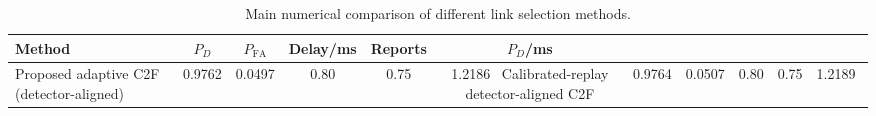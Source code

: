 \begin{table}[t]
    \centering
    \caption{Main numerical comparison of different link selection methods.}
    \label{tab:main_summary}
    \begin{tabular}{l c c c c c}
        \hline
        Method & $P_D$ & $P_{\mathrm{FA}}$ & Delay/ms & Reports & $P_D$/ms \\
        \hline
        Proposed adaptive C2F (detector-aligned) & 0.9762 & 0.0497 & 0.80 & 0.75 & 1.2186 \
        Calibrated-replay detector-aligned C2F & 0.9764 & 0.0507 & 0.80 & 0.75 & 1.2189 \
        \hline
    \end{tabular}
\end{table}
